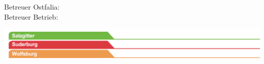 \begin{titlepage}
\begin{minipage}{\dimexpr\textwidth-1.5cm\relax}
		\vspace{0.5cm}		
		
		{\Large\textsf{Betreuer Ostfalia: \documenttutor}} 
		\\	
		{\Large\textsf{Betreuer Betrieb: \documenttutorfirma}}
	\end{minipage}
	
	\vspace{2em}
	
	
	\enlargethispage{10\baselineskip}
	
	\includegraphics[scale=1.20]{bilder/reiter_szsudwob_174mm.jpg}
	
\end{titlepage}

\restoregeometry
